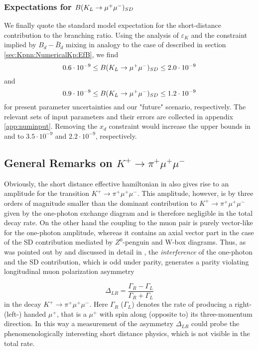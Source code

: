 \subsubsection{Expectations for $B(K_L \to \mu^+\mu^-)_{SD}$}
\label{sec:KLmm:NumericalKL:EfB}
We finally quote the standard model expectation for the 
short-distance contribution to the \klmm branching ratio. Using the
analysis of $\varepsilon_K$ and the constraint implied by
$B_d-\bar B_d$ mixing in analogy to the case of \kpnn described in
section \ref{sec:Kpnn:NumericalKp:EfB}, we find
\begin{equation}\label{klmm1}
0.6\cdot 10^{-9}\leq B(K_L \to \mu^+\mu^-)_{SD}\leq 2.0\cdot 10^{-9}
\end{equation}
and
\begin{equation}\label{klmm2}
0.9\cdot 10^{-9}\leq B(K_L \to \mu^+\mu^-)_{SD}\leq 1.2\cdot 10^{-9}
\end{equation}
for present parameter uncertainties and our "future" scenario,
respectively. The relevant sets of input parameters and their errors
are collected in appendix \ref{app:numinput}.  Removing the $x_d$
constraint would increase the upper bounds in  and
 to $3.5 \cdot 10^{-9}$ and $2.2 \cdot 10^{-9}$,
respectively.

\subsection{General Remarks on $K^+\to\pi^+\mu^+\mu^-$}
\label{sec:KLmm:GeneralKp}
Obviously, the short distance effective hamiltonian in  also
gives rise to an amplitude for the transition $K^+\to\pi^+\mu^+\mu^-$.
This amplitude, however, is by three orders of magnitude smaller than
the dominant contribution to $K^+\to\pi^+\mu^+\mu^-$ given by the
one-photon exchange diagram \cite{eckeretal:87} and is therefore
negligible in the total decay rate. On the other hand the coupling to
the muon pair is purely vector-like for the one-photon amplitude,
whereas it contains an axial vector part in the case of the SD
contribution mediated by $Z^0$-penguin and W-box diagrams.  Thus, as
was pointed out by \cite{savagewise:90} and discussed in detail in
\cite{luetal:92}, the {\em interference\/} of the one-photon and the SD
contribution, which is odd under parity, generates a parity violating
longitudinal muon polarization asymmetry

\begin{equation}\label{delr}
\Delta_{LR}=\frac{\Gamma_R-\Gamma_L}{\Gamma_R+\Gamma_L}
\end{equation}
in the decay $K^+\to\pi^+\mu^+\mu^-$. Here $\Gamma_R$ ($\Gamma_L$)
denotes the rate of producing a right- (left-) handed $\mu^+$, that is
a $\mu^+$ with spin along (opposite to) its three-momentum direction.
In this way a measurement of the asymmetry $\Delta_{LR}$ could probe
the phenomenologically interesting short distance physics, which is not
visible in the total rate.

